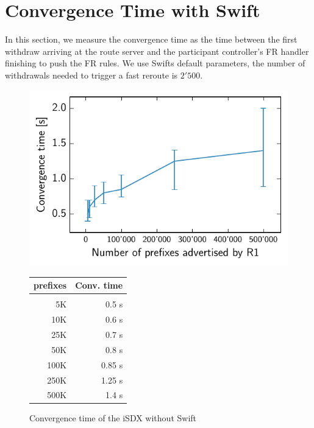 \section{\label{chapter5:Convergence time with Swift}Convergence Time with Swift}

In this section, we measure the convergence time as the time between the first withdraw arriving at the route server and the participant controller's FR handler finishing to push the FR rules. We use Swifts default parameters, the number of withdrawals needed to trigger a fast reroute is $2'500$.

\begin{figure}[h]
\centering
\begin{minipage}[t]{.4\textwidth}
\centering
\vspace{0pt}
\includegraphics[scale = 1]{Figures/swift.pdf}
\end{minipage}\hfill
\begin{minipage}[t]{.4\textwidth}
\centering
\vspace{0pt}
\begin{tabular}{@{}rr@{}}
	\\
	prefixes & Conv. time \\
	\hline
	\\
    5K & 0.5 s  \\
    10K & 0.6 s   \\
    25K & 0.7 s   \\
    50K & 0.8 s  \\
    100K & 0.85 s \\
    250K & 1.25 s   \\
    500K & 1.4 s  \\
\end{tabular}
\end{minipage}
\caption{Convergence time of the iSDX without Swift}
\label{fig:withswift}
\end{figure}

